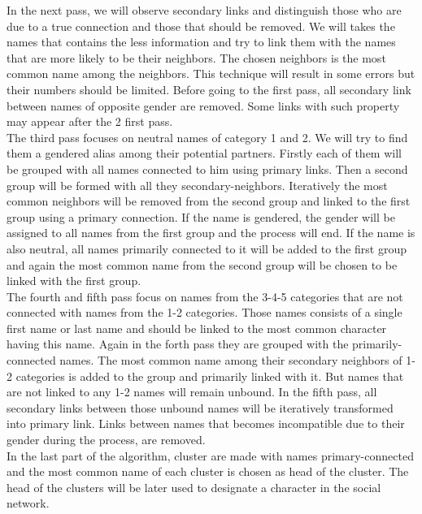 \documentclass[a4paper, 12pt]{report}
\begin{document}
In the next pass, we will observe secondary links and distinguish those who are due to a true connection and those that should be removed. 
We will takes the names that contains the less information and try to link them with the names that are more likely to be their neighbors. 
The chosen neighbors is the most common name among the neighbors. This technique will result in some errors but their numbers should be limited. 
Before going to the first pass, all secondary link between names of opposite gender are removed. Some links with such property may appear after the 2 first pass.\\

The third pass focuses on neutral names of category 1 and 2. We will try to find them a gendered alias among their potential partners. 
Firstly each of them will be grouped with all names connected to him using  primary links. Then a second group will be formed with all they secondary-neighbors. 
Iteratively the most common neighbors  will be removed from the second group and linked to the first group using a  primary  connection. 
If the name is gendered, the gender will be assigned to all names from the first group and the process will end. 
If the name is also neutral, all names  primarily connected to it will be added to the first group and again the most common name from the second group will be chosen to be linked with the first group.\\

The fourth and fifth pass focus on names from the 3-4-5 categories that are not connected with names from the 1-2 categories. 
Those names consists of a single first name or last name and should be linked to the most common character having this name. 
Again in the forth pass they are grouped with the primarily-connected names. 
The most common name among their secondary neighbors of 1-2 categories is added to the group and  primarily linked with it. 
But names that are not linked to any 1-2 names will remain unbound. 
In the fifth pass, all secondary links between those unbound names will be iteratively transformed into primary link. 
Links between names that becomes incompatible due to their gender during the process, are removed.\\

In the last part of the algorithm, cluster are made with names primary-connected and the most common name of each cluster is chosen as head of the cluster. 
The head of the clusters will be later used to designate a character in the social network.
\end{document}

